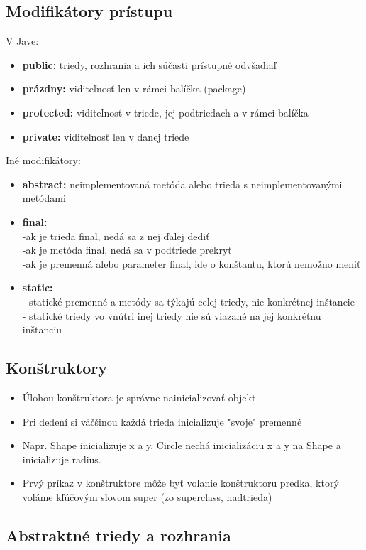 	\subsection{Modifikátory prístupu}
	V Jave:
		\begin{itemize}
			\item \textbf{public:} triedy, rozhrania a ich súčasti prístupné odvšadiaľ
			\item \textbf{prázdny:} viditeľnosť len v rámci balíčka (package)
			\item \textbf{protected:} viditeľnosť v triede, jej podtriedach a v rámci balíčka
			\item \textbf{private:} viditeľnosť len v danej triede
		\end{itemize}
	Iné modifikátory:
		\begin{itemize}
		\item \textbf{abstract:} neimplementovaná metóda alebo trieda s neimplementovanými metódami
		\item \textbf{final:}\\
			-ak je trieda final, nedá sa z nej ďalej dediť\\
			-ak je metóda final, nedá sa v podtriede prekryť\\
			-ak je premenná alebo parameter final, ide o konštantu, ktorú nemožno meniť
		\item \textbf{static:}\\
			- statické premenné a metódy sa týkajú celej triedy, nie konkrétnej inštancie\\
			- statické triedy vo vnútri inej triedy nie sú viazané na jej konkrétnu inštanciu
		\end{itemize}
	\subsection{Konštruktory}
		\begin{itemize}
			\item Úlohou konštruktora je správne nainicializovať objekt
			\item Pri dedení si väčšinou každá trieda inicializuje "svoje" premenné
			\item Napr. Shape inicializuje x a y, Circle nechá inicializáciu x a y na Shape a inicializuje radius.
			\item Prvý príkaz v konštruktore môže byť volanie konštruktoru predka, ktorý voláme kľúčovým slovom super (zo superclass, nadtrieda)
		\end{itemize}
	\subsection{Abstraktné triedy a rozhrania}

